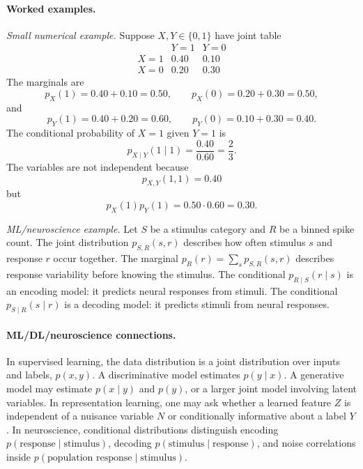 \paragraph{Worked examples.}
\emph{Small numerical example.} Suppose \(X,Y\in\{0,1\}\) have joint table
\[
\begin{array}{c|cc}
&Y=1&Y=0\\
\hline
X=1&0.40&0.10\\
X=0&0.20&0.30
\end{array}
\]
The marginals are
\[
p_X(1)=0.40+0.10=0.50,
\qquad
p_X(0)=0.20+0.30=0.50,
\]
and
\[
p_Y(1)=0.40+0.20=0.60,
\qquad
p_Y(0)=0.10+0.30=0.40.
\]
The conditional probability of \(X=1\) given \(Y=1\) is
\[
p_{X\mid Y}(1\mid1)=\frac{0.40}{0.60}=\frac{2}{3}.
\]
The variables are not independent because
\[
p_{X,Y}(1,1)=0.40
\]
but
\[
p_X(1)p_Y(1)=0.50\cdot0.60=0.30.
\]

\emph{ML/neuroscience example.} Let \(S\) be a stimulus category and \(R\) be a binned spike count. The joint distribution \(p_{S,R}(s,r)\) describes how often stimulus \(s\) and response \(r\) occur together. The marginal \(p_R(r)=\sum_s p_{S,R}(s,r)\) describes response variability before knowing the stimulus. The conditional \(p_{R\mid S}(r\mid s)\) is an encoding model: it predicts neural responses from stimuli. The conditional \(p_{S\mid R}(s\mid r)\) is a decoding model: it predicts stimuli from neural responses.

\paragraph{ML/DL/neuroscience connections.}
In supervised learning, the data distribution is a joint distribution over inputs and labels, \(p(x,y)\). A discriminative model estimates \(p(y\mid x)\). A generative model may estimate \(p(x\mid y)\) and \(p(y)\), or a larger joint model involving latent variables. In representation learning, one may ask whether a learned feature \(Z\) is independent of a nuisance variable \(N\) or conditionally informative about a label \(Y\). In neuroscience, conditional distributions distinguish encoding \(p(\text{response}\mid\text{stimulus})\), decoding \(p(\text{stimulus}\mid\text{response})\), and noise correlations inside \(p(\text{population response}\mid\text{stimulus})\).

